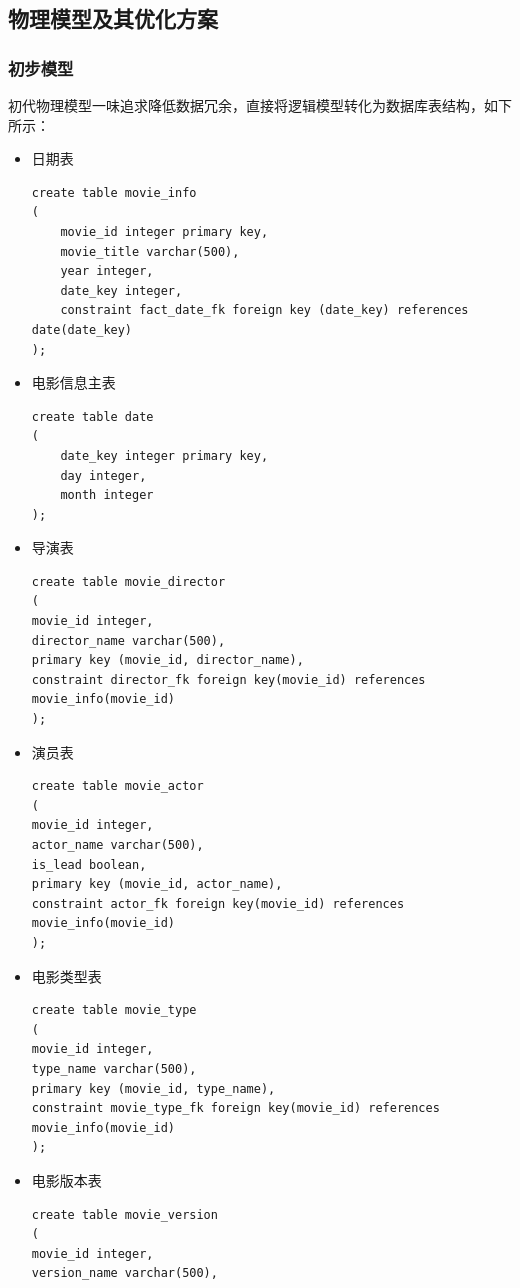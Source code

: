 \documentclass{ctexrep}
\begin{document}
	\subsection{物理模型及其优化方案}
	\subsubsection{初步模型} \label{mysql:1}
	初代物理模型一味追求降低数据冗余，直接将逻辑模型转化为数据库表结构，如下所示：
	\begin{itemize}
	    \item 日期表
	        \begin{lstlisting}
create table movie_info
(
    movie_id integer primary key,
    movie_title varchar(500),
    year integer,
    date_key integer,
    constraint fact_date_fk foreign key (date_key) references date(date_key)
);
	        \end{lstlisting}
	    \item 电影信息主表
	        \begin{lstlisting}
create table date
(
    date_key integer primary key,
    day integer,
    month integer
);
            \end{lstlisting}
        \item 导演表
            \begin{lstlisting}
create table movie_director
(
movie_id integer,
director_name varchar(500),
primary key (movie_id, director_name),
constraint director_fk foreign key(movie_id) references movie_info(movie_id)
);
            \end{lstlisting}
        \item 演员表
            \begin{lstlisting}
create table movie_actor
(
movie_id integer,
actor_name varchar(500),
is_lead boolean,
primary key (movie_id, actor_name),
constraint actor_fk foreign key(movie_id) references movie_info(movie_id)
);
            \end{lstlisting}
        \item 电影类型表
            \begin{lstlisting}
create table movie_type
(
movie_id integer,
type_name varchar(500),
primary key (movie_id, type_name),
constraint movie_type_fk foreign key(movie_id) references movie_info(movie_id)
);
            \end{lstlisting}
        \item 电影版本表
            \begin{lstlisting}
create table movie_version
(
movie_id integer,
version_name varchar(500),

\end{lstlisting}
\end{itemize}
\end{document}
